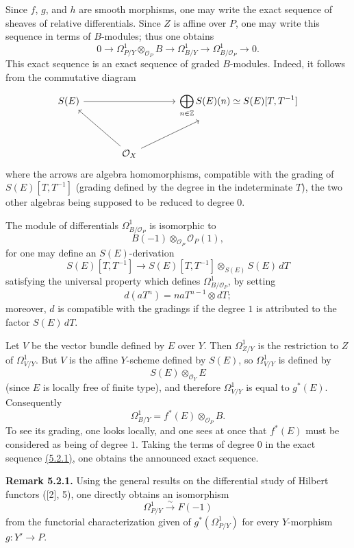 Since \(f\), \(g\), and \(h\) are smooth morphisms, one may write the exact sequence of sheaves of relative differentials. Since \(Z\) is affine over \(P\), one may write this sequence in terms of \(B\)-modules; thus one obtains
\begin{equation}\tag{5.2.1}
0\longrightarrow
 \Omega^1_{P/Y}\otimes_{\mathcal O_P}B
\longrightarrow
 \Omega^1_{B/Y}
\longrightarrow
 \Omega^1_{B/\mathcal O_P}
\longrightarrow0 .
\end{equation}
This exact sequence is an exact sequence of graded \(B\)-modules. Indeed, it follows from the commutative diagram
\[
\begin{tikzcd}[column sep=large,row sep=large]
S(E) \arrow[rr] && \displaystyle\bigoplus_{n\in\mathbb Z}S(E)(n)\simeq S(E)[T,T^{-1}]\\
& \mathcal O_X \arrow[ul] \arrow[ur] &
\end{tikzcd}
\]
where the arrows are algebra homomorphisms, compatible with the grading of \(S(E)[T,T^{-1}]\) (grading defined by the degree in the indeterminate \(T\)), the two other algebras being supposed to be reduced to degree \(0\).

The module of differentials \(\Omega^1_{B/\mathcal O_P}\) is isomorphic to
\[
 B(-1)\otimes_{\mathcal O_P}\mathcal O_P(1),
\]
for one may define an \(S(E)\)-derivation
\[
S(E)[T,T^{-1}]
\longrightarrow
S(E)[T,T^{-1}]\otimes_{S(E)}S(E)\,dT
\]
satisfying the universal property which defines \(\Omega^1_{B/\mathcal O_P}\), by setting
\[
 d(aT^n)=naT^{n-1}\otimes dT;
\]
moreover, \(d\) is compatible with the gradings if the degree \(1\) is attributed to the factor \(S(E)\,dT\).

Let \(V\) be the vector bundle defined by \(E\) over \(Y\). Then \(\Omega^1_{Z/Y}\) is the restriction to \(Z\) of \(\Omega^1_{V/Y}\). But \(V\) is the affine \(Y\)-scheme defined by \(S(E)\), so \(\Omega^1_{V/Y}\) is defined by
\[
S(E)\otimes_{\mathcal O_Y}E
\]
(since \(E\) is locally free of finite type), and therefore \(\Omega^1_{V/Y}\) is equal to \(g^*(E)\). Consequently
\[
\Omega^1_{B/Y}=f^*(E)\otimes_{\mathcal O_P}B.
\]
To see its grading, one looks locally, and one sees at once that \(f^*(E)\) must be considered as being of degree \(1\). Taking the terms of degree \(0\) in the exact sequence \hyperlink{sga6.e08.eq.5-2-1}{(5.2.1)}, one obtains the announced exact sequence.

\textbf{Remark 5.2.1.} Using the general results on the differential study of Hilbert functors ([2], 5), one directly obtains an isomorphism
\[
\Omega^1_{P/Y}\xrightarrow{\sim}F(-1)
\]
from the functorial characterization given of \(g^*(\Omega^1_{P/Y})\) for every \(Y\)-morphism \(g:Y'\to P\).

